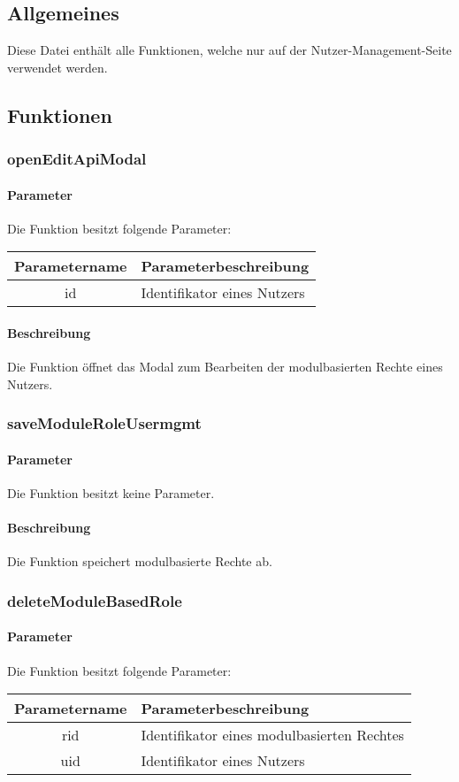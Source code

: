 \subsection{Allgemeines} Diese Datei enthält alle Funktionen, welche nur auf der Nutzer-Management-Seite verwendet werden.
\subsection{Funktionen}
\subsubsection{openEditApiModal}
\paragraph{Parameter} Die Funktion besitzt folgende Parameter:
\begin{table}[H]
	\begin{tabular}{|c|p{11cm}|}
		\hline
		\textbf{Parametername} & \textbf{Parameterbeschreibung} \\ \hline
		id & Identifikator eines Nutzers \\ \hline
	\end{tabular}
\end{table}
\paragraph{Beschreibung} Die Funktion öffnet das Modal zum Bearbeiten der modulbasierten Rechte eines Nutzers.
\subsubsection{saveModuleRoleUsermgmt}
\paragraph{Parameter} Die Funktion besitzt keine Parameter.
\paragraph{Beschreibung} Die Funktion speichert modulbasierte Rechte ab.
\subsubsection{deleteModuleBasedRole}
\paragraph{Parameter} Die Funktion besitzt folgende Parameter:
\begin{table}[H]
	\begin{tabular}{|c|p{11cm}|}
		\hline
		\textbf{Parametername} & \textbf{Parameterbeschreibung} \\ \hline
		rid & Identifikator eines modulbasierten Rechtes \\ \hline
		uid & Identifikator eines Nutzers \\ \hline
	\end{tabular}
\end{table}
